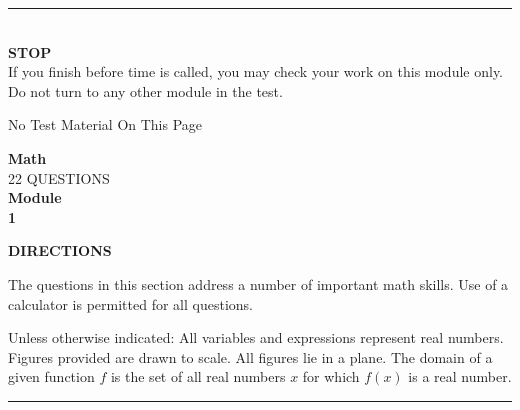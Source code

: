 \documentclass[11pt, twocolumn]{article}
\newcommand{\currentmodulename}{}
\newcommand{\setmodulename}[1]{\renewcommand{\currentmodulename}{#1}}
\newcounter{questionnum}
\begin{document}
\onecolumn
\thispagestyle{plainpage}
\vfill
\begin{center}
\rule{0.8\textwidth}{0.5pt}\\[6pt]
{\large\textbf{STOP}}\\[4pt]
{\small If you finish before time is called, you may check your work on this module only.\\
Do not turn to any other module in the test.}
\end{center}
\onecolumn
\newpage
\thispagestyle{plainpage}
\begin{center}
\vspace*{3in}
{\large No Test Material On This Page}
\end{center}

\setmodulename{Medium}
\onecolumn
\newpage
\thispagestyle{plainpage}
\setcounter{questionnum}{0}
\begin{center}
{\Large\textbf{Math}}\\[6pt]
{\large 22 QUESTIONS}\\[4pt]
{\large\textbf{Module}}\\
{\Large\textbf{1}}
\end{center}
\vspace{8pt}
\textbf{DIRECTIONS}

The questions in this section address a number of important math skills. Use of a calculator is permitted for all questions.

Unless otherwise indicated: All variables and expressions represent real numbers. Figures provided are drawn to scale. All figures lie in a plane. The domain of a given function $f$ is the set of all real numbers $x$ for which $f(x)$ is a real number.
\vspace{8pt}
\hrule
\vspace{8pt}
\twocolumn
\pagestyle{questionpage}
\end{document}
